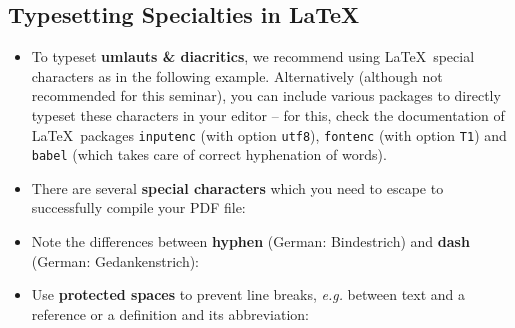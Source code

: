 \documentclass[11pt,a4paper]{article}
\begin{document}
\subsection{Typesetting Specialties in \LaTeX}
\label{sec-spec:tex}
\begin{itemize}
 \item To typeset \textbf{umlauts \& diacritics}, we recommend using \LaTeX~special characters as in the following example.
 Alternatively (although not recommended for this seminar), you can include various packages to directly typeset these characters in your editor -- for this, check the documentation of \LaTeX~packages \texttt{inputenc} (with option \texttt{utf8}), \texttt{fontenc} (with option \texttt{T1}) and \texttt{babel} (which takes care of correct hyphenation of words).
 \vspace{-1em}
 \begin{texexample}
  
  
\end{texexample}

 \vspace{0.5cm}
 \item There are several \textbf{special characters} which you need to escape to successfully compile your PDF file:
 \vspace{-1em}
 \begin{texexample}
   
  
 \end{texexample}
 
 \item Note the differences between \textbf{hyphen} (German: Bindestrich) and \textbf{dash} (German: Gedankenstrich):
 \vspace{-1em}
 \begin{texexample}
   \begin{NoHyper}
     
  
    \end{NoHyper}
 \end{texexample}
 
 \item Use \textbf{protected spaces} to prevent line breaks, \emph{e.g.} between text and a reference or a definition and its abbreviation:


\end{itemize}
\end{document}
